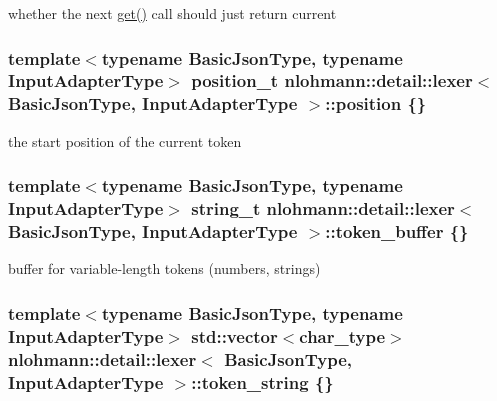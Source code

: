 whether the next \hyperlink{classnlohmann_1_1detail_1_1lexer_a9cd3e4cf04d19be521beb8868c1a2fc9}{get()} call should just return current 

\subsubsection[{\texorpdfstring{position}{position}}]{\setlength{\rightskip}{0pt plus 5cm}template$<$typename Basic\+Json\+Type, typename Input\+Adapter\+Type$>$ {\bf position\+\_\+t} {\bf nlohmann\+::detail\+::lexer}$<$ Basic\+Json\+Type, Input\+Adapter\+Type $>$\+::position \{\}\hspace{0.3cm}{\ttfamily [private]}}\hypertarget{classnlohmann_1_1detail_1_1lexer_a8a1bda107ce1622c0cb3174fa12155ea}{}\label{classnlohmann_1_1detail_1_1lexer_a8a1bda107ce1622c0cb3174fa12155ea}


the start position of the current token 

\subsubsection[{\texorpdfstring{token\+\_\+buffer}{token_buffer}}]{\setlength{\rightskip}{0pt plus 5cm}template$<$typename Basic\+Json\+Type, typename Input\+Adapter\+Type$>$ {\bf string\+\_\+t} {\bf nlohmann\+::detail\+::lexer}$<$ Basic\+Json\+Type, Input\+Adapter\+Type $>$\+::token\+\_\+buffer \{\}\hspace{0.3cm}{\ttfamily [private]}}\hypertarget{classnlohmann_1_1detail_1_1lexer_ac4eaf39567bd5f0750e5d7e913fb474d}{}\label{classnlohmann_1_1detail_1_1lexer_ac4eaf39567bd5f0750e5d7e913fb474d}


buffer for variable-\/length tokens (numbers, strings) 

\subsubsection[{\texorpdfstring{token\+\_\+string}{token_string}}]{\setlength{\rightskip}{0pt plus 5cm}template$<$typename Basic\+Json\+Type, typename Input\+Adapter\+Type$>$ std\+::vector$<${\bf char\+\_\+type}$>$ {\bf nlohmann\+::detail\+::lexer}$<$ Basic\+Json\+Type, Input\+Adapter\+Type $>$\+::token\+\_\+string \{\}\hspace{0.3cm}{\ttfamily [private]}}\hypertarget{classnlohmann_1_1detail_1_1lexer_a94aec416b883f742ba7f20bd16adb3c3}{}\label{classnlohmann_1_1detail_1_1lexer_a94aec416b883f742ba7f20bd16adb3c3}


